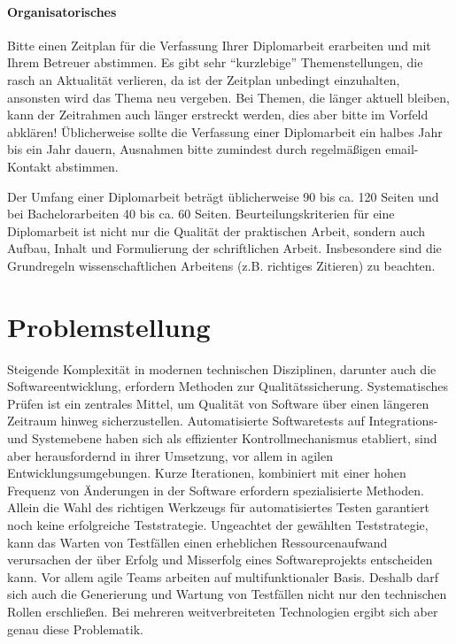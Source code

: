 \paragraph{Organisatorisches}
\makeatletter\ifthesis@masterthesis
Bitte einen Zeitplan für die Verfassung Ihrer Diplomarbeit erarbeiten und mit Ihrem Betreuer abstimmen. Es gibt sehr \enquote{kurzlebige} Themenstellungen, die rasch an Aktualität verlieren, da ist der Zeitplan unbedingt einzuhalten, ansonsten wird das Thema neu vergeben. Bei Themen, die länger aktuell bleiben, kann der Zeitrahmen auch länger erstreckt werden, dies aber bitte im Vorfeld abklären! Üblicherweise sollte die Verfassung einer Diplomarbeit ein halbes Jahr bis ein Jahr dauern, Ausnahmen bitte zumindest durch regelmäßigen email-Kontakt abstimmen.
\fi\makeatother

Der Umfang einer Diplomarbeit beträgt üblicherweise 90 bis ca. 120 Seiten und bei Bachelorarbeiten 40 bis ca. 60 Seiten. Beurteilungskriterien für eine Diplomarbeit ist nicht nur die Qualität der praktischen Arbeit, sondern auch Aufbau, Inhalt und Formulierung der schriftlichen Arbeit. Insbesondere sind die Grundregeln wissenschaftlichen Arbeitens (z.B. richtiges Zitieren) zu beachten.


\section{Problemstellung}

Steigende Komplexität in modernen technischen Disziplinen, darunter auch die Softwareentwicklung, erfordern Methoden zur Qualitätssicherung. Systematisches Prüfen ist ein zentrales Mittel, um Qualität von Software über einen längeren Zeitraum hinweg sicherzustellen\cite{spillner_software_2014}. Automatisierte Softwaretests auf Integrations- und Systemebene haben sich als effizienter Kontrollmechanismus etabliert\cite{dustin_software_2000}, sind aber herausfordernd in ihrer Umsetzung, vor allem in agilen Entwicklungsumgebungen. Kurze Iterationen, kombiniert mit einer hohen Frequenz von Änderungen in der Software erfordern spezialisierte Methoden\cite{linz_testing_2014}. Allein die Wahl des richtigen Werkzeugs für automatisiertes Testen garantiert noch keine erfolgreiche Teststrategie. Ungeachtet der gewählten Teststrategie, kann das Warten von Testfällen einen erheblichen Ressourcenaufwand verursachen der über Erfolg und Misserfolg eines Softwareprojekts entscheiden kann\cite{dustin_software_2000}. Vor allem agile Teams arbeiten auf multifunktionaler Basis. Deshalb darf sich auch die Generierung und Wartung von Testfällen nicht nur den technischen Rollen erschließen\cite{linz_testing_2014}. Bei mehreren weitverbreiteten Technologien ergibt sich aber genau diese Problematik.\\

